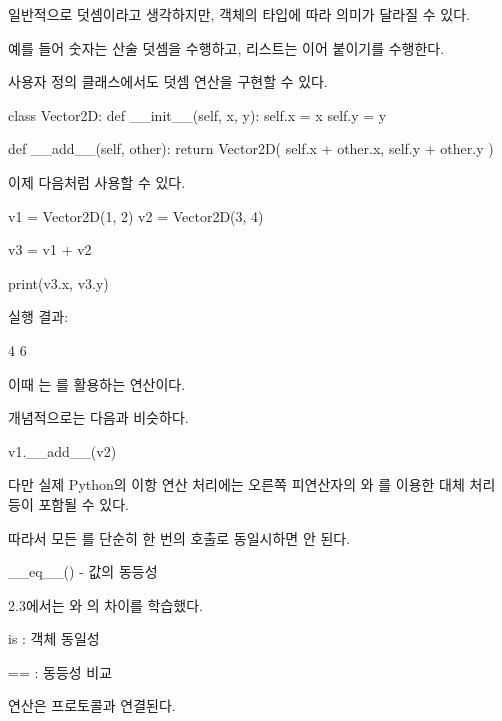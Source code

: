 일반적으로 덧셈이라고 생각하지만, 객체의 타입에 따라 의미가 달라질 수 있다.

예를 들어 숫자는 산술 덧셈을 수행하고, 리스트는 이어 붙이기를 수행한다.

사용자 정의 클래스에서도 덧셈 연산을 구현할 수 있다.

\begin{dhkcode}
class Vector2D:
    def __init__(self, x, y):
        self.x = x
        self.y = y

    def __add__(self, other):
        return Vector2D(
            self.x + other.x,
            self.y + other.y
        )
\end{dhkcode}

이제 다음처럼 사용할 수 있다.

\begin{dhkcode}
v1 = Vector2D(1, 2)
v2 = Vector2D(3, 4)

v3 = v1 + v2

print(v3.x, v3.y)
\end{dhkcode}

실행 결과:

\begin{dhkzsh}
4 6
\end{dhkzsh}

이때 는 를 활용하는 연산이다.

개념적으로는 다음과 비슷하다.

\begin{dhkcode}
v1.__add__(v2)
\end{dhkcode}

다만 실제 Python의 이항 연산 처리에는 오른쪽 피연산자의 와 를 이용한 대체 처리 등이 포함될 수 있다.

따라서 모든 를 단순히  한 번의 호출로 동일시하면 안 된다.

\begin{dhknote}
\begin{dhksmry}[centered]
__eq__() - 값의 동등성
\end{dhksmry}
\end{dhknote}

2.3에서는 와 \zsh{==}의 차이를 학습했다.

\begin{dhksmry}
    is : 객체 동일성

    == : 동등성 비교
\end{dhksmry}

\zsh{==} 연산은  프로토콜과 연결된다.

